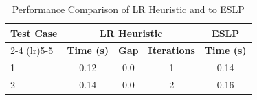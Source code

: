 \begin{table}[h]
    \centering
    \caption{Performance Comparison of LR Heuristic and to ESLP}
    \label{tab:baseline_performance}
    \renewcommand{\arraystretch}{1.2}
    \setlength{\tabcolsep}{10pt} %
    
    \begin{tabular}{l ccc c}
        \toprule
        \textbf{Test Case} & \multicolumn{3}{c}{\textbf{LR Heuristic}} & \textbf{ESLP} \\
        \cmidrule(lr){2-4} \cmidrule(lr){5-5}
         & \textbf{Time (s)} & \textbf{Gap} & \textbf{Iterations} & \textbf{Time (s)} \\
        \midrule
        1 & 0.12 & 0.0 & 1 & 0.14 \\
        2 & 0.14 & 0.0 & 2 & 0.16 \\
        \bottomrule
    \end{tabular}
\end{table}
